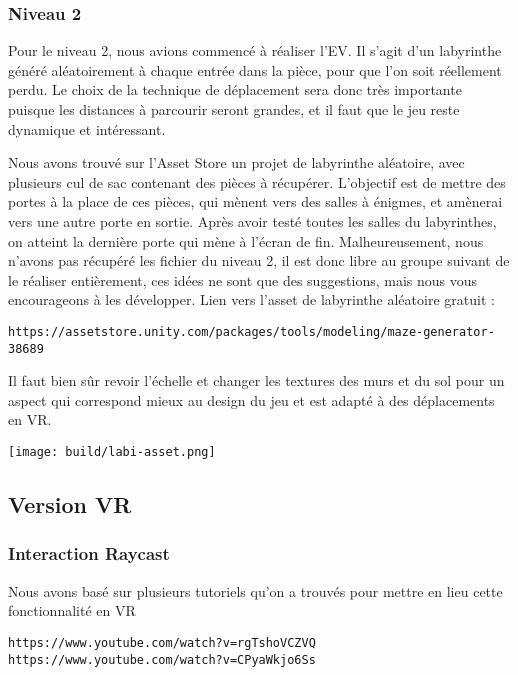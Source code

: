 \documentclass[12pt]{article}
\begin{document}
\subsubsection{Niveau 2}
Pour le niveau 2, nous avions commencé à réaliser l’EV. Il s’agit d’un labyrinthe généré aléatoirement à chaque entrée dans la pièce, pour que l’on soit réellement perdu. Le choix de la technique de déplacement sera donc très importante puisque les distances à parcourir seront grandes, et il faut que le jeu reste dynamique et intéressant.

Nous avons trouvé sur l’Asset Store un projet de labyrinthe aléatoire, avec plusieurs cul de sac contenant des pièces à récupérer. L’objectif est de mettre des portes à la place de ces pièces, qui mènent vers des salles à énigmes, et amènerai vers une autre porte en sortie. Après avoir testé toutes les salles du labyrinthes, on atteint la dernière porte qui mène à l’écran de fin. Malheureusement, nous n’avons pas récupéré les fichier du niveau 2, il est donc libre au groupe suivant de le réaliser entièrement, ces idées ne sont que des suggestions, mais nous vous encourageons à les développer. Lien vers l’asset de labyrinthe aléatoire gratuit :
\begin{center}
    \verb!https://assetstore.unity.com/packages/tools/modeling/maze-generator-38689!
\end{center}

Il faut bien sûr revoir l’échelle et changer les textures des murs et du sol pour un aspect qui correspond mieux au design du jeu et est adapté à des déplacements en VR.

\begin{center}
    \texttt{[image: build/labi-asset.png]}
\end{center}

\subsection{Version VR}
\subsubsection{Interaction Raycast}
Nous avons basé sur plusieurs tutoriels qu’on a trouvés pour mettre en lieu cette fonctionnalité en VR
\begin{center}
    \verb!https://www.youtube.com/watch?v=rgTshoVCZVQ!
    \verb!https://www.youtube.com/watch?v=CPyaWkjo6Ss!
\end{center}
\end{document}
